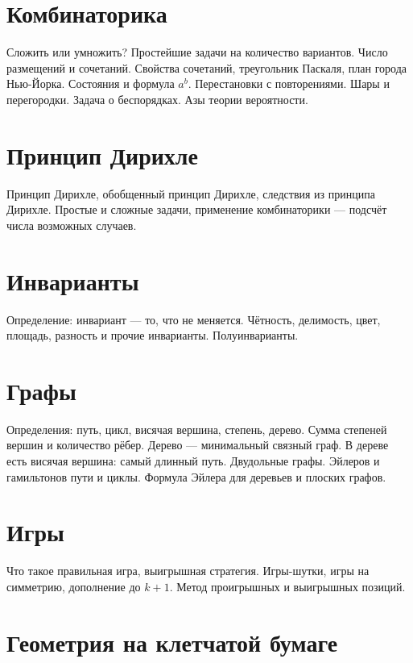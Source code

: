 \documentclass[a4paper,11pt,landscape]{article}
\begin{document}
\begin{paracol}{2}
\section{Комбинаторика}

Сложить или умножить? Простейшие задачи на количество вариантов. Число размещений и сочетаний. Свойства сочетаний, треугольник Паскаля, план города Нью-Йорка. Состояния и формула $a^b$. Перестановки с повторениями. Шары и перегородки. Задача о беспорядках. Азы теории вероятности.

\section{Принцип Дирихле}

Принцип Дирихле, обобщенный принцип Дирихле, следствия из принципа Дирихле. Простые и сложные задачи, применение комбинаторики — подсчёт числа возможных случаев.

\section{Инварианты}

Определение: инвариант — то, что не меняется. Чётность, делимость, цвет, площадь, разность и прочие инварианты. Полуинварианты.

\switchcolumn
\setcounter{section}{8}

\section{Графы}

Определения: путь, цикл, висячая вершина, степень, дерево. Сумма степеней вершин и количество рёбер. Дерево — минимальный связный граф. В дереве есть висячая вершина: самый длинный путь. Двудольные графы. Эйлеров и гамильтонов пути и циклы. Формула Эйлера для деревьев и плоских графов.

\section{Игры}

Что такое правильная игра, выигрышная стратегия. Игры-шутки, игры на симметрию, дополнение до $k+1$. Метод проигрышных и выигрышных позиций.

\section{Геометрия на клетчатой бумаге}


\end{paracol}
\end{document}
